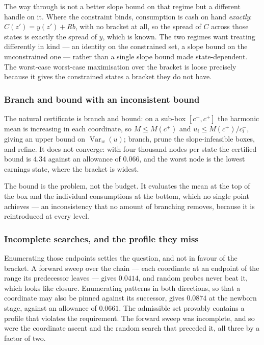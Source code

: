 The way through is not a better slope bound on that regime but a different handle on it. Where the
constraint binds, consumption is cash on hand \emph{exactly}: $C(z')=y(z')+Rb$, with no bracket at
all, so the spread of $C$ across those states is exactly the spread of $y$, which is known. The two
regimes want treating differently in kind --- an identity on the constrained set, a slope bound on
the unconstrained one --- rather than a single slope bound made state-dependent. The worst-case
worst-case maximisation over the bracket is loose precisely because it gives the constrained states a
bracket they do not have.

\subsubsection*{Branch and bound with an inconsistent bound}

The natural certificate is branch and bound: on a sub-box $[c^-,c^+]$ the harmonic mean is increasing
in each coordinate, so $M\le M(c^+)$ and $u_i\le M(c^+)/c^-_i$, giving an upper bound on
$\operatorname{Var}_w(u)$; branch, prune the slope-infeasible boxes, and refine. It does not converge:
with four thousand nodes per state the certified bound is $4.34$ against an allowance of $0.066$, and
the worst node is the lowest earnings state, where the bracket is widest.

The bound is the problem, not the budget. It evaluates the mean at the top of the box and the
individual consumptions at the bottom, which no single point achieves --- an inconsistency that no
amount of branching removes, because it is reintroduced at every level.

\subsubsection*{Incomplete searches, and the profile they miss}

Enumerating those endpoints settles the question, and not in favour of the bracket. A forward sweep
over the chain --- each coordinate at an endpoint of the range its predecessor leaves --- gives
$0.0414$, and random probes never beat it, which looks like closure. Enumerating patterns in both
directions, so that a coordinate may also be pinned against its successor, gives $\mathbf{0.0874}$ at
the newborn stage, against an allowance of $0.0661$. The admissible set provably contains a profile
that violates the requirement. The forward sweep was incomplete, and so were the coordinate ascent and
the random search that preceded it, all three by a factor of two.

